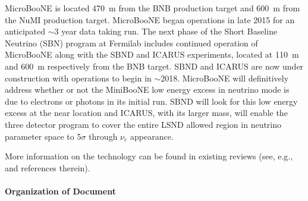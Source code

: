 
MicroBooNE is located 470~m from the BNB production target and 600~m from the NuMI production target.  MicroBooNE began operations in late 2015 for an anticipated $\sim$3 year data taking run.   The next phase of the Short Baseline Neutrino (SBN) program at Fermilab includes continued operation of MicroBooNE along with the SBND and ICARUS experiments, located at 110~m and 600~m respectively from the BNB target.  SBND and ICARUS are now under construction  \cite{Adams:2013-lar1nd} with operations to begin in $\sim$2018.  MicroBooNE will definitively address whether or not the MiniBooNE low energy excess in neutrino mode is due to electrons or photons in its initial run.  SBND will look for this low energy excess at the near location and ICARUS, with its larger mass, will enable the three detector program to cover the entire LSND allowed region in neutrino parameter space to 5$\sigma$ through $\nu_e$ appearance.






More information on the \lartpc technology can be found in existing reviews (see, e.g.,~\cite{Marchionni:2013} and references therein).
 
 \paragraph{Organization of Document}


